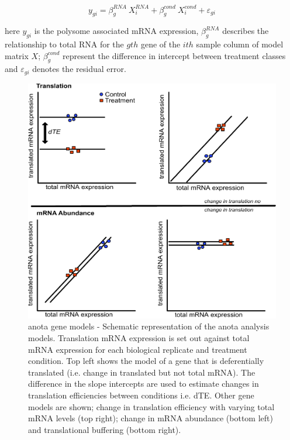 \documentclass[
  12pt,
  openany]{book}
\begin{document}
\[y_{gi} = \beta_g^{RNA}\ X_i^{RNA}+ \beta_g^{cond}\ X_i^{cond} + \varepsilon_{gi}\]

here \(y_{gi}\) is the polysome associated mRNA expression, \(\beta_g^{RNA}\) describes the relationship to total RNA for the \(gth\) gene of the \(ith\) sample column of model matrix \(X\); \(\beta_g^{cond}\) represent the difference in intercept between treatment classes and \(\varepsilon_{gi}\) denotes the residual error.

\begin{figure}
  \includegraphics{./figures/geneModes_anota_Larsson.pdf}
  \caption{anota gene models - Schematic representation of the anota analysis models. Translation mRNA expression is set out against total mRNA expression for each biological replicate and treatment condition. Top left shows the model of a gene that is deferentially translated (i.e. change in translated but not total mRNA). The difference in the slope intercepts are used to estimate changes in translation efficiencies between conditions i.e. dTE. Other gene models are shown; change in translation efficiency with varying total mRNA levels (top right); change in mRNA abundance (bottom left) and translational buffering (bottom right).
  \label{fig:anota}}
\end{figure}
\end{document}
